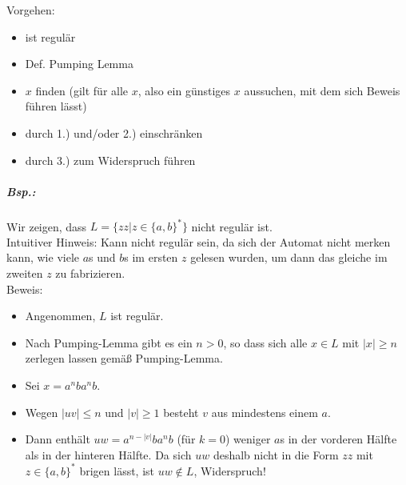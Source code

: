 Vorgehen:
\begin{itemize}
\item ist regulär
\item Def. Pumping Lemma
\item $x$ finden (gilt für alle $x$, also ein günstiges $x$ aussuchen, mit dem sich Beweis führen lässt)
\item durch 1.) und/oder 2.) einschränken
\item durch 3.) zum Widerspruch führen
\end{itemize}

\subparagraph{Bsp.:} Wir zeigen, dass $L=\{zz|z\in \{a,b\}^*\}$ nicht regulär ist.\\
Intuitiver Hinweis: Kann nicht regulär sein, da sich der Automat nicht merken kann, wie viele $a$s und $b$s im ersten $z$ gelesen wurden, um dann das gleiche im zweiten $z$ zu fabrizieren.\\
Beweis: 
\begin{itemize}
\item Angenommen, $L$ ist regulär.
\item Nach Pumping-Lemma gibt es ein $n>0$, so dass sich alle $x \in L$ mit $|x|\geq n$ zerlegen lassen gemäß Pumping-Lemma.
\item Sei $x=a^nb a^nb$.
\item Wegen $|uv|\leq n$ und $|v|\geq 1$ besteht $v$ aus mindestens einem $a$.\\
\item Dann enthält $uw=a^{n-|v|}ba^nb$ (für $k=0$) weniger $a$s in der vorderen Hälfte als in der hinteren Hälfte. Da sich $uw$ deshalb nicht in die Form $zz$ mit $z\in \{a,b\}^*$ brigen lässt, ist $uw \not \in L$, Widerspruch!
\end{itemize}


